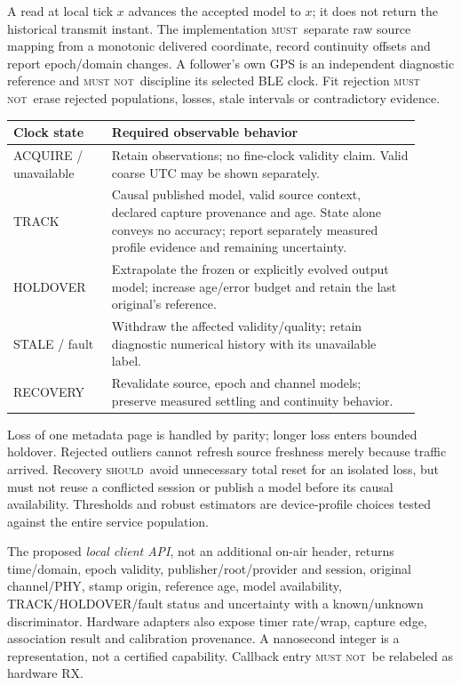 \documentclass[11pt,letterpaper]{article}
\newcommand{\must}{\textsc{must}}
\newcommand{\mustnot}{\textsc{must not}}
\newcommand{\should}{\textsc{should}}
\begin{document}
A read at local tick $x$ advances the accepted model to $x$; it does not return the historical transmit instant. The implementation \must\ separate raw source mapping from a monotonic delivered coordinate, record continuity offsets and report epoch/domain changes. A follower's own GPS is an independent diagnostic reference and \mustnot\ discipline its selected BLE clock. Fit rejection \mustnot\ erase rejected populations, losses, stale intervals or contradictory evidence.

\begin{center}\small
\begin{tabular}{@{}L{0.22\linewidth}L{0.69\linewidth}@{}}\toprule
Clock state & Required observable behavior \\\midrule
ACQUIRE / unavailable & Retain observations; no fine-clock validity claim. Valid coarse UTC may be shown separately. \\
TRACK & Causal published model, valid source context, declared capture provenance and age. State alone conveys no accuracy; report separately measured profile evidence and remaining uncertainty. \\
HOLDOVER & Extrapolate the frozen or explicitly evolved output model; increase age/error budget and retain the last original's reference. \\
STALE / fault & Withdraw the affected validity/quality; retain diagnostic numerical history with its unavailable label. \\
RECOVERY & Revalidate source, epoch and channel models; preserve measured settling and continuity behavior. \\\bottomrule
\end{tabular}
\end{center}
Loss of one metadata page is handled by parity; longer loss enters bounded holdover. Rejected outliers cannot refresh source freshness merely because traffic arrived. Recovery \should\ avoid unnecessary total reset for an isolated loss, but must not reuse a conflicted session or publish a model before its causal availability. Thresholds and robust estimators are device-profile choices tested against the entire service population.

The proposed \emph{local client API}, not an additional on-air header, returns time/domain, epoch validity, publisher/root/provider and session, original channel/PHY, stamp origin, reference age, model availability, TRACK/HOLDOVER/fault status and uncertainty with a known/unknown discriminator. Hardware adapters also expose timer rate/wrap, capture edge, association result and calibration provenance. A nanosecond integer is a representation, not a certified capability. Callback entry \mustnot\ be relabeled as hardware RX.
\end{document}
